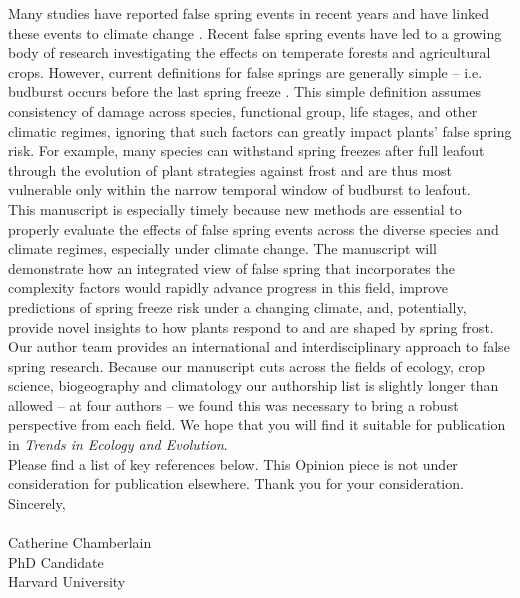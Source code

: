 \documentclass[11pt,a4paper]{article}\usepackage[]{graphicx}\usepackage[]{color}
\begin{document}
\noindent Many studies have reported false spring events in recent years and have linked these events to climate change \citep[e.g.][]{Augspurger2013, Menzel2015}. Recent false spring events have led to a growing body of research investigating the effects on temperate forests and agricultural crops. However, current definitions for false springs are generally simple -- i.e. budburst occurs before the last spring freeze \citep{Gu2008}. This simple definition assumes consistency of damage across species, functional group, life stages, and other climatic regimes, ignoring that such factors can greatly impact plants' false spring risk. For example, many species can withstand spring freezes after full leafout through the evolution of plant strategies against frost and are thus most vulnerable only within the narrow temporal window of budburst to leafout. \\

\noindent This manuscript is especially timely because new methods are essential to properly evaluate the effects of false spring events across the diverse species and climate regimes, especially under climate change. The manuscript will demonstrate how an integrated view of false spring that incorporates the complexity factors would rapidly advance progress in this field, improve predictions of spring freeze risk under a changing climate, and, potentially, provide novel insights to how plants respond to and are shaped by spring frost. \\

\noindent Our author team provides an international and interdisciplinary approach to false spring research. Because our manuscript cuts across the fields of ecology, crop science, biogeography and climatology our authorship list is slightly longer than allowed -- at four authors -- we found this was necessary to bring a robust perspective from each field. We hope that you will find it suitable for publication in \textit{Trends in Ecology and Evolution}. \\

\noindent Please find a list of key references below. This Opinion piece is not under consideration for publication elsewhere. Thank you for your consideration. \\

\vspace{1.5ex}
\noindent Sincerely, \\
\vspace{1.5ex}\\
\noindent Catherine Chamberlain\\
\noindent PhD Candidate\\
\noindent Harvard University
\end{document}
